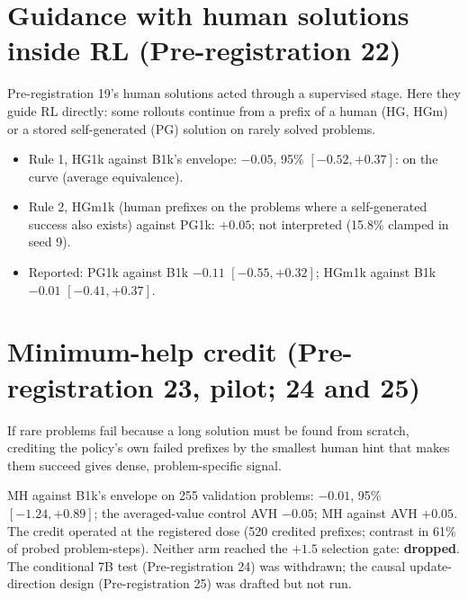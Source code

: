 \documentclass[11pt]{article}
\begin{document}
\section{Guidance with human solutions inside RL (Pre-registration 22)}
\begin{why}
Pre-registration 19's human solutions acted through a supervised stage. Here they guide RL directly: some rollouts continue from a prefix of a human (HG, HGm) or a stored self-generated (PG) solution on rarely solved problems.
\end{why}
\begin{found}
\begin{itemize}[leftmargin=*,itemsep=1pt]
\item Rule 1, HG1k against B1k's envelope: $-0.05$, 95\% $[-0.52,+0.37]$: on the curve (average equivalence).
\item Rule 2, HGm1k (human prefixes on the problems where a self-generated success also exists) against PG1k: $+0.05$; not interpreted (15.8\% clamped in seed 9).
\item Reported: PG1k against B1k $-0.11$ $[-0.55,+0.32]$; HGm1k against B1k $-0.01$ $[-0.41,+0.37]$.
\end{itemize}
\end{found}

\section{Minimum-help credit (Pre-registration 23, pilot; 24 and 25)}
\begin{why}
If rare problems fail because a long solution must be found from scratch, crediting the policy's own failed prefixes by the smallest human hint that makes them succeed gives dense, problem-specific signal.
\end{why}
\begin{found}
MH against B1k's envelope on 255 validation problems: $-0.01$, 95\% $[-1.24,+0.89]$; the averaged-value control AVH $-0.05$; MH against AVH $+0.05$. The credit operated at the registered dose (520 credited prefixes; contrast in 61\% of probed problem-steps). Neither arm reached the $+1.5$ selection gate: \textbf{dropped}. The conditional 7B test (Pre-registration 24) was withdrawn; the causal update-direction design (Pre-registration 25) was drafted but not run.
\end{found}

\end{document}
